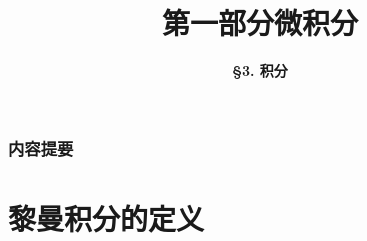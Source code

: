 

\title[Calculus]{\LARGE \bfseries 第一部分\quad 微积分} %
\author[Integral] %
{\Large \bfseries \S 3. 积分
}
\date{}



\begin{frame}
\titlepage %
\end{frame}

\begin{frame}
\frametitle{内容提要} %
\tableofcontents %
\end{frame}


\section{黎曼积分的定义} %

